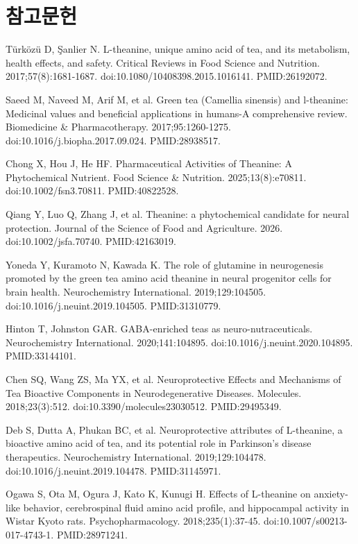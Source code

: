 \documentclass[12pt,oneside]{book}
\newcommand{\refstart}{\par\begingroup\fontsize{8.5pt}{10.2pt}\selectfont\setlength{\parskip}{1.4pt}\raggedright}
\newcommand{\reff}[2]{\par\hangindent=7mm\hangafter=1\noindent[#1]\hspace{2mm}#2\par}
\begin{document}
\section*{참고문헌}

\refstart

\reff{1}{Türközü D, Şanlier N. L-theanine, unique amino acid of tea, and its metabolism, health effects, and safety. Critical Reviews in Food Science and Nutrition. 2017;57(8):1681-1687. doi:10.1080/10408398.2015.1016141. PMID:26192072.}

\reff{2}{Saeed M, Naveed M, Arif M, et al. Green tea (Camellia sinensis) and l-theanine: Medicinal values and beneficial applications in humans-A comprehensive review. Biomedicine \& Pharmacotherapy. 2017;95:1260-1275. doi:10.1016/j.biopha.2017.09.024. PMID:28938517.}

\reff{3}{Chong X, Hou J, He HF. Pharmaceutical Activities of Theanine: A Phytochemical Nutrient. Food Science \& Nutrition. 2025;13(8):e70811. doi:10.1002/fsn3.70811. PMID:40822528.}

\reff{4}{Qiang Y, Luo Q, Zhang J, et al. Theanine: a phytochemical candidate for neural protection. Journal of the Science of Food and Agriculture. 2026. doi:10.1002/jsfa.70740. PMID:42163019.}

\reff{5}{Yoneda Y, Kuramoto N, Kawada K. The role of glutamine in neurogenesis promoted by the green tea amino acid theanine in neural progenitor cells for brain health. Neurochemistry International. 2019;129:104505. doi:10.1016/j.neuint.2019.104505. PMID:31310779.}

\reff{6}{Hinton T, Johnston GAR. GABA-enriched teas as neuro-nutraceuticals. Neurochemistry International. 2020;141:104895. doi:10.1016/j.neuint.2020.104895. PMID:33144101.}

\reff{7}{Chen SQ, Wang ZS, Ma YX, et al. Neuroprotective Effects and Mechanisms of Tea Bioactive Components in Neurodegenerative Diseases. Molecules. 2018;23(3):512. doi:10.3390/molecules23030512. PMID:29495349.}

\reff{8}{Deb S, Dutta A, Phukan BC, et al. Neuroprotective attributes of L-theanine, a bioactive amino acid of tea, and its potential role in Parkinson's disease therapeutics. Neurochemistry International. 2019;129:104478. doi:10.1016/j.neuint.2019.104478. PMID:31145971.}

\reff{9}{Ogawa S, Ota M, Ogura J, Kato K, Kunugi H. Effects of L-theanine on anxiety-like behavior, cerebrospinal fluid amino acid profile, and hippocampal activity in Wistar Kyoto rats. Psychopharmacology. 2018;235(1):37-45. doi:10.1007/s00213-017-4743-1. PMID:28971241.}
\end{document}
